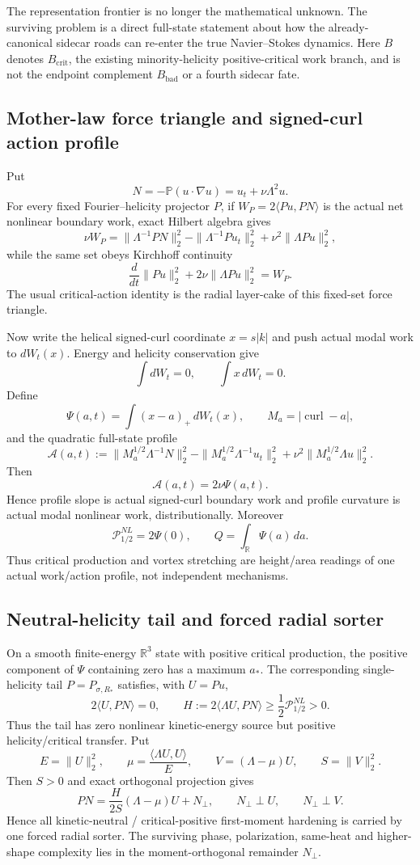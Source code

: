 \documentclass[11pt]{article}
\newcommand{\curl}{\operatorname{curl}}
\begin{document}
The representation frontier is no longer the mathematical unknown.  The surviving problem is a direct full-state statement about how the already-canonical sidecar roads can re-enter the true Navier--Stokes dynamics.  Here $B$ denotes $B_{\mathrm{crit}}$, the existing minority-helicity positive-critical work branch, and is not the endpoint complement $B_{\mathrm{bad}}$ or a fourth sidecar fate.

\subsection{Mother-law force triangle and signed-curl action profile}
Put
\[
N=-\mathbb P(u\cdot\nabla u)=u_t+\nu\Lambda^2u.
\]
For every fixed Fourier--helicity projector $P$, if
$W_P=2\langle Pu,PN\rangle$ is the actual net nonlinear boundary work, exact Hilbert algebra gives
\[
\nu W_P
=\|\Lambda^{-1}PN\|_2^2
-\|\Lambda^{-1}Pu_t\|_2^2
+\nu^2\|\Lambda Pu\|_2^2,
\]
while the same set obeys Kirchhoff continuity
\[
\frac d{dt}\|Pu\|_2^2+2\nu\|\Lambda Pu\|_2^2=W_P.
\]
The usual critical-action identity is the radial layer-cake of this fixed-set force triangle.

Now write the helical signed-curl coordinate $x=s|k|$ and push actual modal work to $dW_t(x)$.  Energy and helicity conservation give
\[
\int dW_t=0,
\qquad
\int x\,dW_t=0.
\]
Define
\[
\Psi(a,t)=\int (x-a)_+\,dW_t(x),
\qquad M_a=|\curl-a|,
\]
and the quadratic full-state profile
\[
\mathcal A(a,t)
:=\|M_a^{1/2}\Lambda^{-1}N\|_2^2
-\|M_a^{1/2}\Lambda^{-1}u_t\|_2^2
+\nu^2\|M_a^{1/2}\Lambda u\|_2^2.
\]
Then
\[
\boxed{\mathcal A(a,t)=2\nu\Psi(a,t)}.
\]
Hence profile slope is actual signed-curl boundary work and profile curvature is actual modal nonlinear work, distributionally.  Moreover
\[
\mathcal P_{1/2}^{NL}=2\Psi(0),
\qquad
Q=\int_{\mathbb R}\Psi(a)\,da.
\]
Thus critical production and vortex stretching are height/area readings of one actual work/action profile, not independent mechanisms.

\subsection{Neutral-helicity tail and forced radial sorter}
On a smooth finite-energy $\mathbb R^3$ state with positive critical production, the positive component of $\Psi$ containing zero has a maximum $a_*$.  The corresponding single-helicity tail $P=P_{\sigma,R_*}$ satisfies, with $U=Pu$,
\[
2\langle U,PN\rangle=0,
\qquad
H:=2\langle\Lambda U,PN\rangle
\ge \frac12\mathcal P_{1/2}^{NL}>0.
\]
Thus the tail has zero nonlinear kinetic-energy source but positive helicity/critical transfer.  Put
\[
E=\|U\|_2^2,
\qquad
\mu=\frac{\langle\Lambda U,U\rangle}{E},
\qquad
V=(\Lambda-\mu)U,
\qquad
S=\|V\|_2^2.
\]
Then $S>0$ and exact orthogonal projection gives
\[
\boxed{
PN=\frac{H}{2S}(\Lambda-\mu)U+N_\perp,
\qquad
N_\perp\perp U,
\qquad
N_\perp\perp V.}
\]
Hence all kinetic-neutral / critical-positive first-moment hardening is carried by one forced radial sorter.  The surviving phase, polarization, same-heat and higher-shape complexity lies in the moment-orthogonal remainder $N_\perp$.
\end{document}
